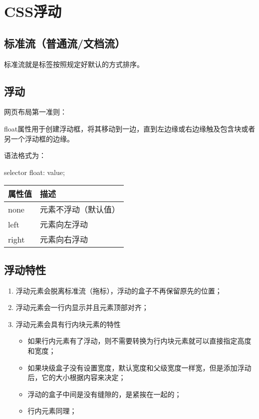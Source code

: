 \section{CSS浮动}
\subsection{标准流（普通流/文档流）}
标准流就是标签按照规定好默认的方式排序。
\subsection{浮动}
网页布局第一准则：

float属性用于创建浮动框，将其移动到一边，直到左边缘或右边缘触及包含块或者另一个浮动框的边缘。

语法格式为：
\begin{css}
    selector {
    float: value;
    }
\end{css}
\begin{table}[H]
    \centering
    \begin{tabular}{ll}
        \hline
        属性值   & 描述         \\
        \hline
        none  & 元素不浮动（默认值） \\
        left  & 元素向左浮动     \\
        right & 元素向右浮动     \\
        \hline
    \end{tabular}
\end{table}
\subsection{浮动特性}
\begin{enumerate}
    \item 浮动元素会脱离标准流（拖标），浮动的盒子不再保留原先的位置；
    \item 浮动元素会一行内显示并且元素顶部对齐；
    \item 浮动元素会具有行内块元素的特性
          \begin{itemize}
              \item 如果行内元素有了浮动，则不需要转换为行内块元素就可以直接指定高度和宽度；
              \item 如果块级盒子没有设置宽度，默认宽度和父级宽度一样宽，但是添加浮动后，它的大小根据内容来决定；
              \item 浮动的盒子中间是没有缝隙的，是紧挨在一起的；
              \item 行内元素同理；
          \end{itemize}
\end{enumerate}

